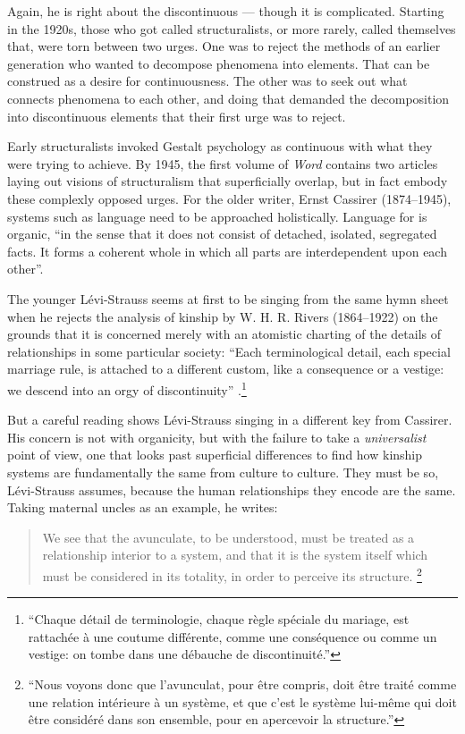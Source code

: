 \documentclass[output=paper]{langscibook}
\begin{document}
Again, he is right about the discontinuous — though it is complicated. Starting in the 1920s, those who got called structuralists, or more rarely, called themselves that, were torn between two urges. One was to reject the methods of an earlier generation who wanted to decompose phenomena into elements. That can be construed as a desire for continuousness. The other was to seek out what connects phenomena to each other, and doing that demanded the decomposition into discontinuous elements that their first urge was to reject.

Early structuralists invoked Gestalt psychology as continuous with what they were trying to achieve. By 1945, the first volume of \emph{Word} contains two articles laying out visions of structuralism that superficially overlap, but in fact embody these complexly opposed urges. For the older writer, Ernst Cassirer (1874--1945), systems such as language need to be approached holistically. Language for \citet[110]{Cassirer1945} is organic, ``in the sense that it does not consist of detached, isolated, segregated facts. It forms a coherent whole in which all parts are interdependent upon each other''.

The younger Lévi-Strauss seems at first to be singing from the same hymn sheet when he rejects the analysis of kinship by W. H. R. Rivers (1864--1922) on the grounds that it is concerned merely with an atomistic charting of the details of relationships in some particular society: ``Each terminological detail, each special marriage rule, is attached to a different custom, like a consequence or a vestige: we descend into an orgy of discontinuity'' \citep[37]{LeviStrauss1945}.\footnote{``Chaque détail de terminologie, chaque règle spéciale du mariage, est rattachée à une coutume différente, comme une conséquence ou comme un vestige: on tombe dans une débauche de discontinuité.''}

But a careful reading shows Lévi-Strauss singing in a different key from Cassirer. His concern is not with organicity, but with the failure to take a \emph{universalist} point of view, one that looks past superficial differences to find how kinship systems are fundamentally the same from culture to culture. They must be so, Lévi-Strauss assumes, because the human relationships they encode are the same. Taking maternal uncles as an example, he writes:

\begin{quotation}
We see that the avunculate, to be understood, must be treated as a relationship interior to a system, and that it is the system itself which must be considered in its totality, in order to perceive its structure. \citep[47]{LeviStrauss1945}\footnote{``Nous voyons donc que l'avunculat, pour être compris, doit être traité comme une relation intérieure à un système, et que c'est le système lui-même qui doit être considéré dans son ensemble, pour en apercevoir la structure.''}
\end{quotation}
\end{document}
